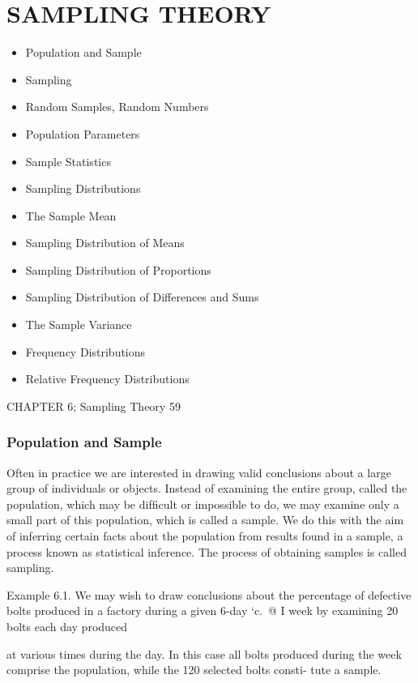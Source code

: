 
\chapter{SAMPLING THEORY}
\begin{itemize}
\item Population and Sample
\item Sampling
\item Random Samples, Random Numbers
\item Population Parameters
\item Sample Statistics
\item Sampling Distributions
\item The Sample Mean
\item Sampling Distribution of Means
\item Sampling Distribution of Proportions
\item Sampling Distribution of Differences and Sums
\item The Sample Variance
\item Frequency Distributions
\item Relative Frequency Distributions
\end{itemize}




CHAPTER 6; Sampling Theory 59
\subsection{Population and Sample}
Often in practice we are interested in drawing valid conclusions about a
large group of individuals or objects. Instead of examining the entire group, called the population, which may be difﬁcult or impossible to do, we may examine only a small part of this population, which is called a
sample. We do this with the aim of inferring certain facts about the population from results found in a sample, a process known as statistical inference. The process of obtaining samples is called sampling.

Example 6.1. We may wish to draw conclusions about the percentage of defective bolts 
produced in a factory during a given 6-day ‘c.\ @ I
week by examining 20 bolts each day produced

at various times during the day. In this case all bolts produced during the week comprise the population, while the 120 selected bolts consti-
tute a sample.

